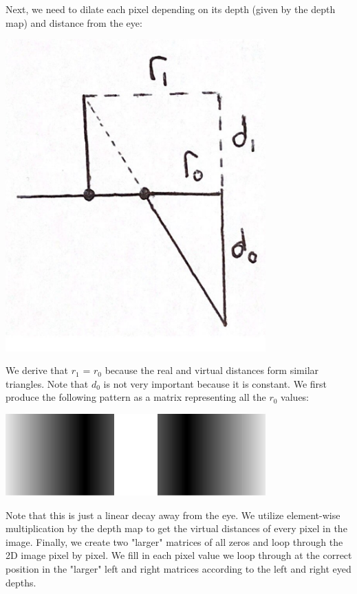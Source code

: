 \documentclass[12pt]{article}
\begin{document}
Next, we need to dilate each pixel depending on its depth (given by the depth map) and distance from the eye:

\begin{center}
\includegraphics[width=100mm]{dilation_pic.png}
\end{center}

We derive that \(r_{1}\) = \(r_{0}\) because the real and virtual distances form similar triangles. Note that \(d_{0}\) is not very important because it is constant. We first produce the following pattern as a matrix representing all the \(r_{0}\) values:

\begin{center}
\includegraphics[width=100mm]{eye_distances.png}
\end{center}

Note that this is just a linear decay away from the eye. We utilize element-wise multiplication by the depth map to get the virtual distances of every pixel in the image. Finally, we create two "larger" matrices of all zeros and loop through the 2D image pixel by pixel. We fill in each pixel value we loop through at the correct position in the "larger" left and right matrices according to the left and right eyed depths.
\end{document}
